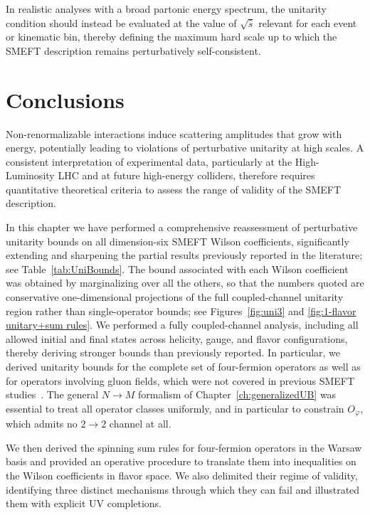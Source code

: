 In realistic
analyses with a broad partonic energy spectrum, the
unitarity condition should instead be evaluated at the
value of $\sqrt{\hat s}$ relevant for each event or
kinematic bin, thereby defining the maximum hard scale
up to which the SMEFT description remains
perturbatively self-consistent.

\section{Conclusions\label{sec:SMEFT_conclusions}}

Non-renormalizable interactions induce scattering amplitudes that grow with energy, potentially
leading to violations of perturbative unitarity at high scales. A consistent interpretation of
experimental data, particularly at the High-Luminosity LHC and at future high-energy colliders,
therefore requires quantitative theoretical criteria to assess the range of validity of the SMEFT
description.

In this chapter we have performed a comprehensive reassessment of perturbative unitarity bounds on
all dimension-six SMEFT Wilson coefficients, significantly extending and sharpening the partial
results previously reported in the literature; see Table~\ref{tab:UniBounds}. The bound associated
with each Wilson coefficient was obtained by marginalizing over all the others, so that the numbers
quoted are conservative one-dimensional projections of the full coupled-channel unitarity region
rather than single-operator bounds; see Figures~\ref{fig:uni3} and
\ref{fig:1-flavor unitary+sum rules}. We performed a fully coupled-channel analysis, including all
allowed initial and final states across helicity, gauge, and flavor configurations, thereby deriving
stronger bounds than previously reported. In particular, we derived unitarity bounds for the complete
set of four-fermion operators as well as for operators involving gluon fields, which were not covered
in previous SMEFT studies~\cite{Corbett:2014ora,Corbett:2017qgl,Cao:2023qks}. The general $N\to M$
formalism of Chapter~\ref{ch:generalizedUB} was essential to treat all operator classes uniformly,
and in particular to constrain $O_\varphi$, which admits no $2\to2$ channel at all.

We then derived the spinning sum rules for four-fermion operators in the Warsaw basis and provided an operative procedure to translate them
into inequalities on the Wilson coefficients in flavor space. We also delimited their regime of
validity, identifying three distinct mechanisms through which they can fail and illustrated them with explicit UV completions.

